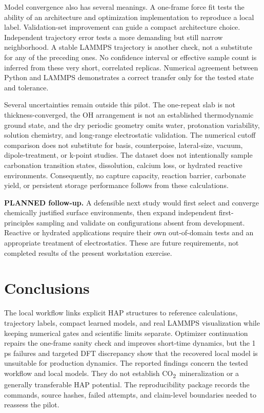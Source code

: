 \documentclass[11pt,a4paper]{article}
\newcommand{\COtwo}{CO\textsubscript{2}}
\begin{document}
Model convergence also has several meanings. A one-frame force fit tests the ability of an architecture and optimization implementation to reproduce a local label. Validation-set improvement can guide a compact architecture choice. Independent trajectory error tests a more demanding but still narrow neighborhood. A stable LAMMPS trajectory is another check, not a substitute for any of the preceding ones. No confidence interval or effective sample count is inferred from these very short, correlated replicas. Numerical agreement between Python and LAMMPS demonstrates a correct transfer only for the tested state and tolerance.

Several uncertainties remain outside this pilot. The one-repeat slab is not thickness-converged, the OH arrangement is not an established thermodynamic ground state, and the dry periodic geometry omits water, protonation variability, solution chemistry, and long-range electrostatic validation. The numerical cutoff comparison does not substitute for basis, counterpoise, lateral-size, vacuum, dipole-treatment, or k-point studies. The dataset does not intentionally sample carbonation transition states, dissolution, calcium loss, or hydrated reactive environments. Consequently, no capture capacity, reaction barrier, carbonate yield, or persistent storage performance follows from these calculations.

\textbf{PLANNED follow-up.} A defensible next study would first select and converge chemically justified surface environments, then expand independent first-principles sampling and validate on configurations absent from development. Reactive or hydrated applications require their own out-of-domain tests and an appropriate treatment of electrostatics. These are future requirements, not completed results of the present workstation exercise.



\section{Conclusions}
The local workflow links explicit HAP structures to reference calculations, trajectory labels, compact learned models, and real LAMMPS visualization while keeping numerical gates and scientific limits separate. Optimizer continuation repairs the one-frame sanity check and improves short-time dynamics, but the 1 ps failures and targeted DFT discrepancy show that the recovered local model is unsuitable for production dynamics. The reported findings concern the tested workflow and local models. They do not establish \COtwo\ mineralization or a generally transferable HAP potential. The reproducibility package records the commands, source hashes, failed attempts, and claim-level boundaries needed to reassess the pilot.
\end{document}
